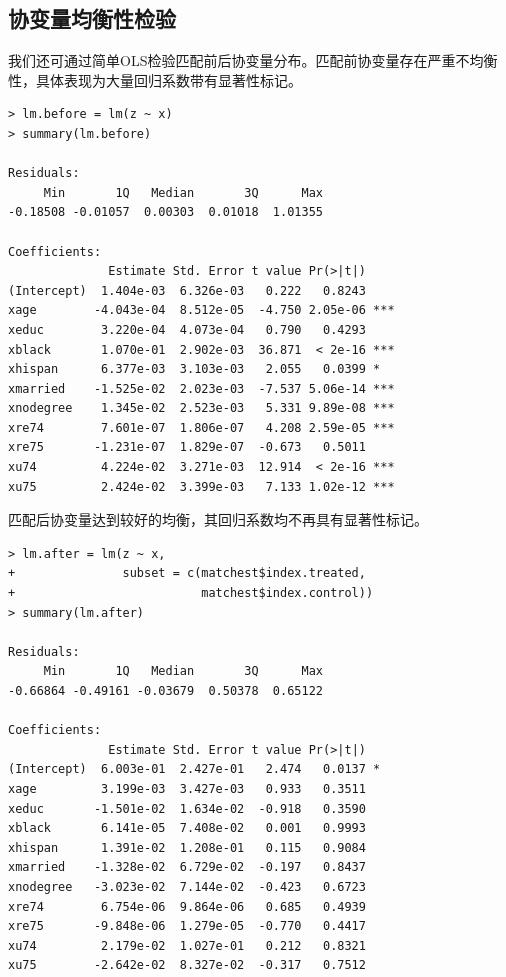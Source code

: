    
   
   \subsection{协变量均衡性检验}
   
我们还可通过简单OLS检验匹配前后协变量分布。匹配前协变量存在严重不均衡性，具体表现为大量回归系数带有显著性标记。 
  \begin{lstlisting}
> lm.before = lm(z ~ x)
> summary(lm.before) 

Residuals:
     Min       1Q   Median       3Q      Max 
-0.18508 -0.01057  0.00303  0.01018  1.01355 

Coefficients:
              Estimate Std. Error t value Pr(>|t|)    
(Intercept)  1.404e-03  6.326e-03   0.222   0.8243    
xage        -4.043e-04  8.512e-05  -4.750 2.05e-06 ***
xeduc        3.220e-04  4.073e-04   0.790   0.4293    
xblack       1.070e-01  2.902e-03  36.871  < 2e-16 ***
xhispan      6.377e-03  3.103e-03   2.055   0.0399 *  
xmarried    -1.525e-02  2.023e-03  -7.537 5.06e-14 ***
xnodegree    1.345e-02  2.523e-03   5.331 9.89e-08 ***
xre74        7.601e-07  1.806e-07   4.208 2.59e-05 ***
xre75       -1.231e-07  1.829e-07  -0.673   0.5011    
xu74         4.224e-02  3.271e-03  12.914  < 2e-16 ***
xu75         2.424e-02  3.399e-03   7.133 1.02e-12 *** 
      \end{lstlisting} 
      
      
      匹配后协变量达到较好的均衡，其回归系数均不再具有显著性标记。
      
      
   \begin{lstlisting}
> lm.after = lm(z ~ x, 
+               subset = c(matchest$index.treated, 
+                          matchest$index.control))
> summary(lm.after) 

Residuals:
     Min       1Q   Median       3Q      Max 
-0.66864 -0.49161 -0.03679  0.50378  0.65122 

Coefficients:
              Estimate Std. Error t value Pr(>|t|)  
(Intercept)  6.003e-01  2.427e-01   2.474   0.0137 *
xage         3.199e-03  3.427e-03   0.933   0.3511  
xeduc       -1.501e-02  1.634e-02  -0.918   0.3590  
xblack       6.141e-05  7.408e-02   0.001   0.9993  
xhispan      1.391e-02  1.208e-01   0.115   0.9084  
xmarried    -1.328e-02  6.729e-02  -0.197   0.8437  
xnodegree   -3.023e-02  7.144e-02  -0.423   0.6723  
xre74        6.754e-06  9.864e-06   0.685   0.4939  
xre75       -9.848e-06  1.279e-05  -0.770   0.4417  
xu74         2.179e-02  1.027e-01   0.212   0.8321  
xu75        -2.642e-02  8.327e-02  -0.317   0.7512
         \end{lstlisting} 
         
